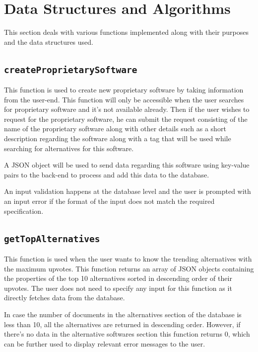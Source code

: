 

\section{Data Structures and Algorithms}
This section deals with various functions implemented along with their purposes and the data structures used.

\subsection{\texttt{createProprietarySoftware}}
This function is used to create new proprietary software by taking information from the user-end. This function will only be accessible when the user searches for proprietary software and it's not available already. Then if the user wishes to request for the proprietary software, he can submit the request consisting of the name of the proprietary software along with other details such as a short description regarding the software along with a tag that will be used while searching for alternatives for this software.

A JSON object will be used to send data regarding this software using key-value pairs to the back-end to process and add this data to the database.

An input validation happens at the database level and the user is prompted with an input error if the format of the input does not match the required specification.

\subsection{\texttt{getTopAlternatives}}
This function is used when the user wants to know the trending alternatives with the maximum upvotes. This function returns an array of JSON objects containing the properties of the top 10 alternatives sorted in descending order of their upvotes. The user does not need to specify any input for this function as it directly fetches data from the database.

In case the number of documents in the alternatives section of the database is less than 10, all the alternatives are returned in descending order. However, if there’s no data in the alternative softwares section this function returns 0, which can be further used to display relevant error messages to the user.


